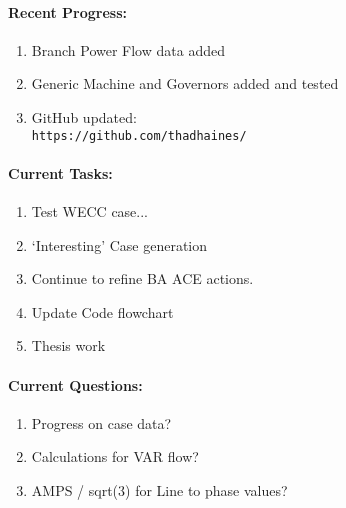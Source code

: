 \documentclass[12pt]{article}
\begin{document}
\begin{multicols}{2}
\raggedright
	\paragraph{Recent Progress:}
	\begin{enumerate}
\itemsep0em 
		\item Branch Power Flow data added

		\item Generic Machine and Governors added and tested


		\item GitHub updated:\\
		\verb|https://github.com/thadhaines/|
		
	\end{enumerate}
\paragraph{Current Tasks:}
	\begin{enumerate}
		\itemsep0em 
		\item Test WECC case...
		\item `Interesting' Case generation
		\item Continue to refine BA ACE actions.
		\item Update Code flowchart%
		\item Thesis work 
		

	\end{enumerate}

	\paragraph{Current Questions:}
	\begin{enumerate}
\itemsep0em 
	\item Progress on case data?
	\item Calculations for VAR flow?
	\item AMPS / sqrt(3) for Line to phase values?
	\end{enumerate}
	

\end{multicols}
\end{document}
